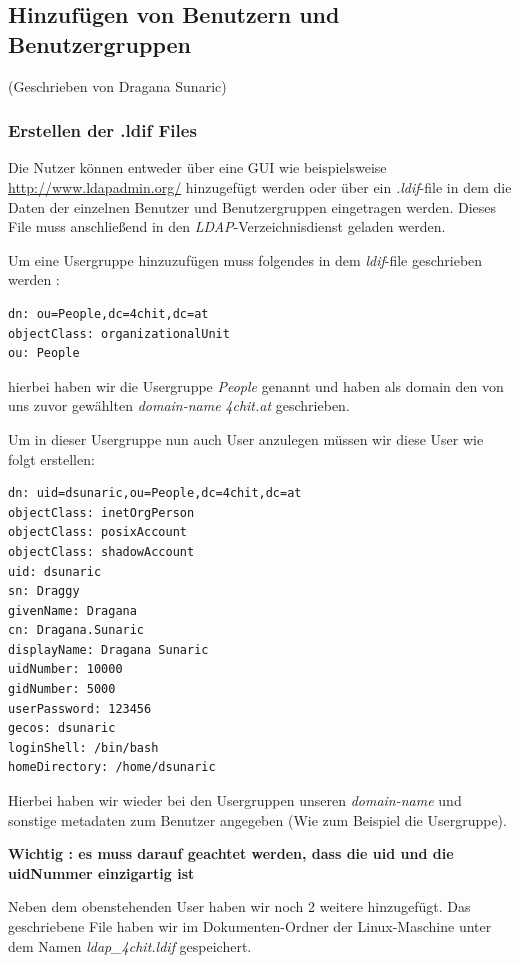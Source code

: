 \subsection{Hinzufügen von Benutzern und Benutzergruppen}
(Geschrieben von Dragana Sunaric)

\subsubsection{Erstellen der .ldif Files}
Die Nutzer können entweder über eine GUI wie beispielsweise \url{http://www.ldapadmin.org/} hinzugefügt werden oder über ein \textit{.ldif}-file in dem 
die Daten der einzelnen Benutzer und Benutzergruppen eingetragen werden.
Dieses File muss anschließend in den \textit{LDAP}-Verzeichnisdienst geladen werden.

Um eine Usergruppe hinzuzufügen muss folgendes in dem \textit{ldif}-file geschrieben werden :

\begin{lstlisting}[caption=Usergruppe hinzufügen]
dn: ou=People,dc=4chit,dc=at
objectClass: organizationalUnit
ou: People
\end{lstlisting}

hierbei haben wir die Usergruppe \textit{People} genannt und haben als domain den von uns zuvor gewählten \textit{domain-name}  \textit{4chit.at} geschrieben.

Um in dieser Usergruppe nun auch User anzulegen müssen wir diese User wie folgt erstellen:

\begin{lstlisting}[caption=User hinzufügen]
dn: uid=dsunaric,ou=People,dc=4chit,dc=at
objectClass: inetOrgPerson
objectClass: posixAccount
objectClass: shadowAccount
uid: dsunaric
sn: Draggy
givenName: Dragana
cn: Dragana.Sunaric
displayName: Dragana Sunaric
uidNumber: 10000
gidNumber: 5000
userPassword: 123456
gecos: dsunaric
loginShell: /bin/bash
homeDirectory: /home/dsunaric
\end{lstlisting}

Hierbei haben wir wieder bei den Usergruppen unseren \textit{domain-name} und sonstige metadaten zum Benutzer angegeben (Wie zum Beispiel die Usergruppe).

\textbf{Wichtig : es muss darauf geachtet werden, dass die uid und die uidNummer einzigartig ist}

Neben dem obenstehenden User haben wir noch 2 weitere hinzugefügt.
Das geschriebene File haben wir im Dokumenten-Ordner der Linux-Maschine unter dem Namen \textit{ldap\_4chit.ldif} gespeichert.

